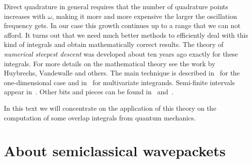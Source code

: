 \documentclass[a4paper,10pt]{article}
\begin{document}
Direct quadrature in general requires that the number of quadrature points
increases with $\omega$, making it more and more expensive the larger the
oscillation frequency gets. In our case this growth continues up to a range
that we can not afford.
It turns out that we need much better methods to efficiently deal with this
kind of integrals and obtain mathematically correct results.
The theory of \emph{numerical steepest descent} was developed about ten
years ago exactly for these integrals. For more details on the mathematical theory
see the work by Huybrechs, Vandewalle and others. The main technique
is described in~\cite{HV_hoq} for the one-dimensional case and in~\cite{HV_cub}
for multivariate integrands. Semi-finite intervals appear in~\cite{H_nsd_sii}.
Other bits and pieces can be found in~\cite{AH_cgq} and~\cite{AH_cgq_it}.

In this text we will concentrate on the application of this theory on
the computation of some overlap integrals from quantum mechanics.


\section{About semiclassical wavepackets}
\end{document}

